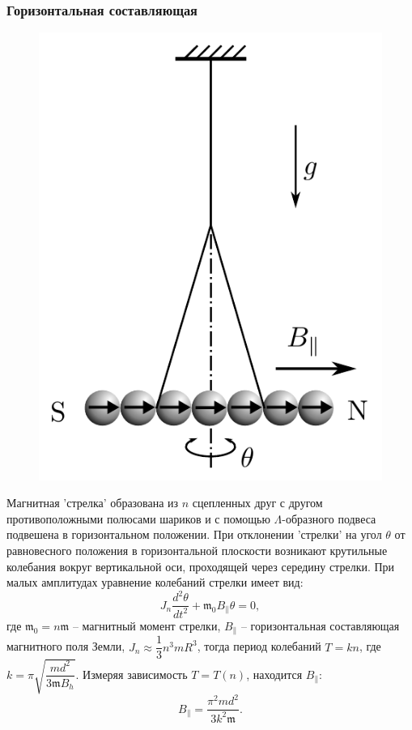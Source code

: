 \documentclass[12pt,a4paper]{article}
\begin{document}
	\subsubsection*{Горизонтальная составляющая}
	\begin{figure}
		\vspace{30pt}
		\includegraphics[width=0.8\linewidth]{res/horizontal.png}
	\end{figure}
 
	Магнитная 'стрелка' образована из $n$ сцепленных друг с другом противоположными полюсами шариков и с помощью $\Lambda$-образного подвеса подвешена в горизонтальном положении. При отклонении 'стрелки' на угол $\theta$ от равновесного положения в горизонтальной плоскости возникают крутильные колебания вокруг вертикальной оси, проходящей через середину стрелки. При малых амплитудах уравнение колебаний
	стрелки имеет вид:
	$$ J_n \dfrac{d^2 \theta}{dt^2} + \mathfrak{m}_0 B_{\parallel} \theta = 0, $$ 
	где $\mathfrak{m}_0 = n \mathfrak{m}$ -- магнитный момент стрелки, $B_{\parallel}$ -- горизонтальная составляющая магнитного поля Земли, $J_n \approx \dfrac{1}{3}n^3 m R^3$, тогда период колебаний $T = kn$, где $k = \pi \sqrt{\dfrac{md^2}{3 \mathfrak{m} B_h}}$. Измеряя зависимость $T=T(n)$, находится $B_{\parallel}$:
	$$ B_{\parallel} = \dfrac{\pi^2 m d^2}{3k^2\mathfrak{m}}. $$
	
\end{document}
